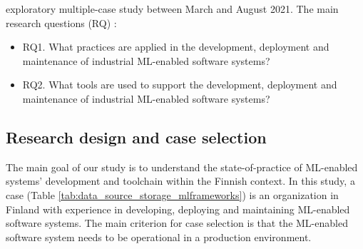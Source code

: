 %

\DIFdelbegin {}\DIFdelend \DIFaddbegin {}\DIFaddend exploratory multiple-case study \cite{Runeson2008} \DIFaddbegin {}\DIFaddend between March and August 2021. 
The main research questions (RQ) \DIFdelbegin {}\DIFdelend \DIFaddbegin {}\DIFaddend :
\begin{itemize}
    \item RQ1. What practices are applied in the development, deployment and maintenance of industrial ML-enabled software systems?
    \item RQ2. What tools are used to support the development, deployment and maintenance of industrial ML-enabled software systems?
\end{itemize}

\subsection{Research design and case selection}
The main goal of our study is to understand the state-of-practice of ML-enabled systems' development and toolchain within the Finnish context. In this study, a case (Table \ref{tab:data_source_storage_mlframeworks}) is an organization in Finland with experience in developing, deploying and maintaining ML-enabled software systems. The main criterion for case selection is that the ML-enabled software system needs to be operational in a production environment. %

